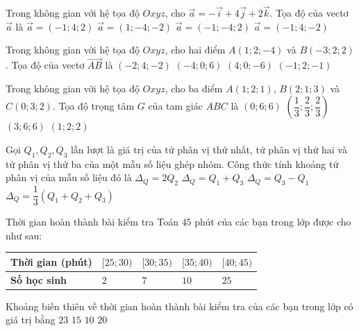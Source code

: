 \begin{ex}%
	Trong không gian với hệ tọa độ $Oxyz$, cho $\overrightarrow{a}=-\overrightarrow{i}+4\overrightarrow{j}+2\overrightarrow{k}$. Tọa độ của vectơ $\overrightarrow{a}$ là
	\choice
	{\True $\overrightarrow{a}=(-1;4;2)$}
	{$\overrightarrow{a}=(1;-4;-2)$}
	{$\overrightarrow{a}=(-1;-4;2)$}
	{$\overrightarrow{a}=(-1;4;-2)$}
\end{ex}

\begin{ex}%
	Trong không gian với hệ tọa độ $Oxyz$, cho hai điểm $A(1;2;-4)$ và $B(-3;2;2)$. Tọa độ của vectơ $\overrightarrow{AB}$ là
	\choice
	{$(-2;4;-2)$}
	{\True $(-4;0;6)$}
	{$(4;0;-6)$}
	{$(-1;2;-1)$}
\end{ex}

\begin{ex}%
	Trong không gian với hệ tọa độ $Oxyz$, cho ba điểm $A(1;2;1)$, $B(2;1;3)$ và $C(0;3;2)$. Tọa độ trọng tâm $G$ của tam giác $ABC$ là
	\choice
	{$(0;6;6)$}
	{$\left(\dfrac{1}{3};\dfrac{2}{3};\dfrac{2}{3}\right) $}
	{$(3;6;6)$}
	{\True $(1;2;2)$}
\end{ex}

\begin{ex}%
	Gọi $Q_1, Q_2, Q_3$ lần lượt là giá trị của tứ phân vị thứ nhất, tứ phân vị thứ hai và tứ phân vị thứ ba của một mẫu số liệu ghép nhóm. Công thức tính khoảng tứ phân vị của mẫu số liệu đó là
	\choice
	{$\Delta_Q=2Q_2$}
	{$\Delta_Q=Q_1+Q_3$}
	{\True $\Delta_Q=Q_3-Q_1$}
	{$\Delta_Q=\dfrac{1}{3}\left( Q_1+Q_2+Q_3\right)$}
\end{ex}

\begin{ex}%
	Thời gian hoàn thành bài kiểm tra Toán $45$ phút của các bạn trong lớp được cho như sau:
	\begin{center}
		\setlength{\extrarowheight}{2pt}
		\newcommand{\PreBackslash}[1]{\let\temp=\\#1\let\\=\temp}
		\let\PBS=\PreBackslash
		\begin{tabular}{|>{\PBS\centering}m{4cm}|>{\PBS\centering}m{2cm}|>{\PBS\centering}m{2cm}| >{\PBS\centering}m{2cm}|>{\PBS\centering}m{2cm}|}\hline
			\textbf{Thời gian (phút)} &$[25;30)$&$[30;35)$&$[35;40)$&$[40;45)$\\
			\hline
			\textbf{Số học sinh}&$2$&$7$&$10$&$25$\\
			\hline
		\end{tabular}
	\end{center}
	Khoảng biến thiên về thời gian hoàn thành bài kiểm tra của các bạn trong lớp có giá trị bằng
	\choice
	{$23$}
	{$15$}
	{$10$}
	{\True $20$}
\end{ex}

